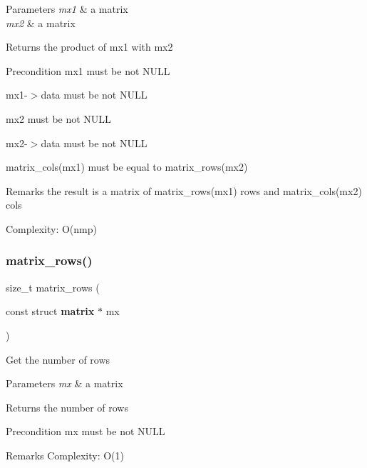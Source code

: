 \begin{DoxyParams}{Parameters}
{\em mx1} & a matrix \\
\hline
{\em mx2} & a matrix \\
\hline
\end{DoxyParams}
\begin{DoxyReturn}{Returns}
the product of {\ttfamily mx1} with {\ttfamily mx2}
\end{DoxyReturn}
\begin{DoxyPrecond}{Precondition}
{\ttfamily mx1} must be not N\+U\+LL 

{\ttfamily mx1-\/$>$data} must be not N\+U\+LL 

{\ttfamily mx2} must be not N\+U\+LL 

{\ttfamily mx2-\/$>$data} must be not N\+U\+LL 

{\ttfamily matrix\+\_\+cols(mx1)} must be equal to {\ttfamily matrix\+\_\+rows(mx2)}
\end{DoxyPrecond}
\begin{DoxyRemark}{Remarks}
the result is a matrix of {\ttfamily matrix\+\_\+rows(mx1)} rows and {\ttfamily matrix\+\_\+cols(mx2)} cols 

Complexity\+: O(nmp) 
\end{DoxyRemark}
\mbox{\label{matrix_8c_a7d9ca687a57f2328a02b9a056964b2fb}} 
\subsubsection{matrix\+\_\+rows()}
{\footnotesize\ttfamily size\+\_\+t matrix\+\_\+rows (\begin{DoxyParamCaption}\item[{const struct \textbf{ matrix} $\ast$}]{mx }\end{DoxyParamCaption})\hspace{0.3cm}{\ttfamily [inline]}}

Get the number of rows


\begin{DoxyParams}{Parameters}
{\em mx} & a matrix \\
\hline
\end{DoxyParams}
\begin{DoxyReturn}{Returns}
the number of rows
\end{DoxyReturn}
\begin{DoxyPrecond}{Precondition}
{\ttfamily mx} must be not N\+U\+LL
\end{DoxyPrecond}
\begin{DoxyRemark}{Remarks}
Complexity\+: O(1) 
\end{DoxyRemark}
\mbox{\label{matrix_8c_a9e159c4c2c953106b7a1a4f0d4a03616}} 
